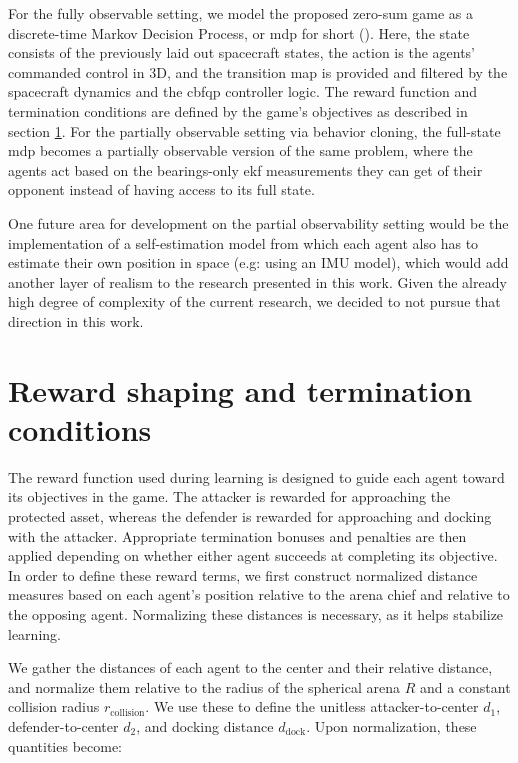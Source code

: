 For the fully observable setting, we model the proposed zero-sum game as a discrete-time Markov Decision Process, or \acs{mdp} for short (\cite{Howard1960DynamicProgramming}). Here, the state consists of the previously laid out spacecraft states, the action is the agents' commanded control in 3D, and the transition map is provided and filtered by the spacecraft dynamics and the \acs{cbfqp} controller logic. The reward function and termination conditions are defined by the game's objectives as described in section \ref{sec:Rewards/Termination}. For the partially observable setting via behavior cloning, the full-state \acs{mdp} becomes a partially observable version of the same problem, where the agents act based on the bearings-only \acs{ekf} measurements they can get of their opponent instead of having access to its full state.

One future area for development on the partial observability setting would be the implementation of a self-estimation model from which each agent also has to estimate their own position in space (e.g: using an IMU model), which would add another layer of realism to the research presented in this work. Given the already high degree of complexity of the current research, we decided to not pursue that direction in this work.


\section{Reward shaping and termination conditions}
\label{sec:Rewards/Termination}

The reward function used during learning is designed to guide each agent toward its objectives in the game. The attacker is rewarded for approaching the protected asset, whereas the defender is rewarded for approaching and docking with the attacker. Appropriate termination bonuses and penalties are then applied depending on whether either agent succeeds at completing its objective. In order to define these reward terms, we first construct normalized distance measures based on each agent's position relative to the arena chief and relative to the opposing agent. Normalizing these distances is necessary, as it helps stabilize learning.

We gather the distances of each agent to the center and their relative distance, and normalize them relative to the radius of the spherical arena \(R\) and a constant collision radius \(r_{\text{collision}}\). We use these to define the unitless attacker-to-center \(d_1\), defender-to-center \(d_2\), and docking distance \(d_{\text{dock}}\). Upon normalization, these quantities become:


